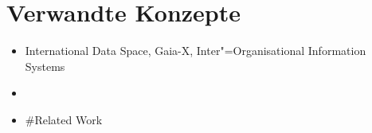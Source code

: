
\section{Verwandte Konzepte}

\begin{itemize}
    \item International Data Space, Gaia-X, Inter"=Organisational Information Systems
    \item \cite{mollerIndustrialDataEcosystems2024}
    \item \cite{sambraSolidPlatformDecentralized2016} \#Related Work
\end{itemize}
